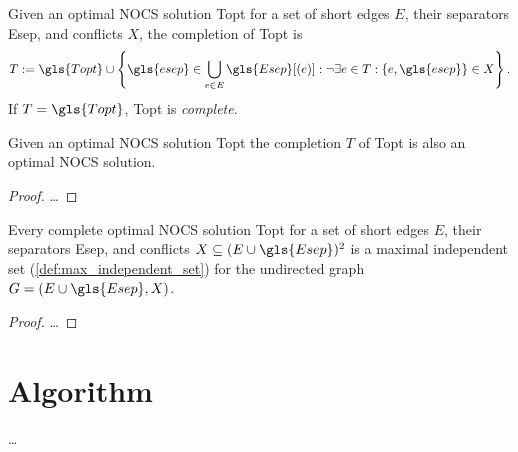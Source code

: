 
\begin{definition}
  Given an optimal \gls{NOCS} solution \gls{Topt}
  for a set of short edges \(E\), their separators \gls{Esep}, 
  and conflicts \(X\), the completion of \gls{Topt} is
  \[
    T := \gls{Topt} \cup \left\{
      \gls{esep} \in \bigcup\limits_{e \in E} \gls{Esep}[(e)]:
      \lnot\exists e \in T : \{e, \gls{esep}\} \in X
    \right\}.
  \]
  If \(T = \gls{Topt}\), \gls{Topt} is \emph{complete}.
\end{definition}


\begin{theorem}
  Given an optimal \gls{NOCS} solution \gls{Topt} the completion \(T\)
  of \gls{Topt} is also an optimal \gls{NOCS} solution.
\end{theorem}

\begin{proof}
  \ldots{}
\end{proof}

\begin{theorem}
  Every complete optimal \gls{NOCS} solution \gls{Topt} for a set of
  short edges \(E\), their separators \gls{Esep}, and conflicts
  \(X \subseteq (E \cup \gls{Esep})^2\) is a maximal independent set
  (\cref{def:max_independent_set}) for the undirected graph
  \(G = (E \cup \gls{Esep}, X)\).
\end{theorem}

\begin{proof}
  \ldots{}
\end{proof}


\section{Algorithm}
\ldots{}


